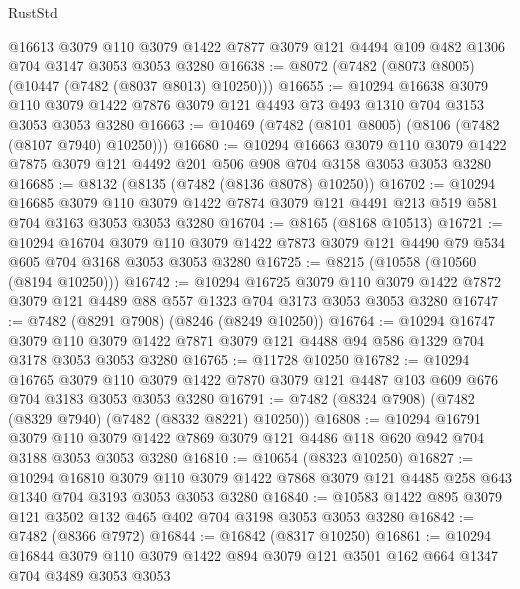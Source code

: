 \begin{lexlean}{RustStd}
\begin{coremodule}
{\begin{coremodule}
{{{{{{{{{{{{{{{{{{{{{{{{{{{{{{{{    @16613
    @3079
    @110
    @3079
    @1422
    @7877
    @3079
    @121
    @4494
    @109
    @482
    @1306
    @704
    @3147
    @3053
    @3053
    @3280
@16638 := @8072 (@7482 (@8073 @8005) (@10447 (@7482 (@8037 @8013) @10250)))
@16655 := @10294
    @16638
    @3079
    @110
    @3079
    @1422
    @7876
    @3079
    @121
    @4493
    @73
    @493
    @1310
    @704
    @3153
    @3053
    @3053
    @3280
@16663 := @10469 (@7482 (@8101 @8005) (@8106 (@7482 (@8107 @7940) @10250)))
@16680 := @10294
    @16663
    @3079
    @110
    @3079
    @1422
    @7875
    @3079
    @121
    @4492
    @201
    @506
    @908
    @704
    @3158
    @3053
    @3053
    @3280
@16685 := @8132 (@8135 (@7482 (@8136 @8078) @10250))
@16702 := @10294
    @16685
    @3079
    @110
    @3079
    @1422
    @7874
    @3079
    @121
    @4491
    @213
    @519
    @581
    @704
    @3163
    @3053
    @3053
    @3280
@16704 := @8165 (@8168 @10513)
@16721 := @10294
    @16704
    @3079
    @110
    @3079
    @1422
    @7873
    @3079
    @121
    @4490
    @79
    @534
    @605
    @704
    @3168
    @3053
    @3053
    @3280
@16725 := @8215 (@10558 (@10560 (@8194 @10250)))
@16742 := @10294
    @16725
    @3079
    @110
    @3079
    @1422
    @7872
    @3079
    @121
    @4489
    @88
    @557
    @1323
    @704
    @3173
    @3053
    @3053
    @3280
@16747 := @7482 (@8291 @7908) (@8246 (@8249 @10250))
@16764 := @10294
    @16747
    @3079
    @110
    @3079
    @1422
    @7871
    @3079
    @121
    @4488
    @94
    @586
    @1329
    @704
    @3178
    @3053
    @3053
    @3280
@16765 := @11728 @10250
@16782 := @10294
    @16765
    @3079
    @110
    @3079
    @1422
    @7870
    @3079
    @121
    @4487
    @103
    @609
    @676
    @704
    @3183
    @3053
    @3053
    @3280
@16791 := @7482 (@8324 @7908) (@7482 (@8329 @7940) (@7482 (@8332 @8221) @10250))
@16808 := @10294
    @16791
    @3079
    @110
    @3079
    @1422
    @7869
    @3079
    @121
    @4486
    @118
    @620
    @942
    @704
    @3188
    @3053
    @3053
    @3280
@16810 := @10654 (@8323 @10250)
@16827 := @10294
    @16810
    @3079
    @110
    @3079
    @1422
    @7868
    @3079
    @121
    @4485
    @258
    @643
    @1340
    @704
    @3193
    @3053
    @3053
    @3280
@16840 := @10583 @1422 @895 @3079 @121 @3502 @132 @465 @402 @704 @3198 @3053 @3053 @3280
@16842 := @7482 (@8366 @7972)
@16844 := @16842 (@8317 @10250)
@16861 := @10294
    @16844
    @3079
    @110
    @3079
    @1422
    @894
    @3079
    @121
    @3501
    @162
    @664
    @1347
    @704
    @3489
    @3053
    @3053
}}}}}}}}}}}}}}}}}}}}}}}}}}}}}}}}
\end{coremodule}}
\end{coremodule}
\end{lexlean}
